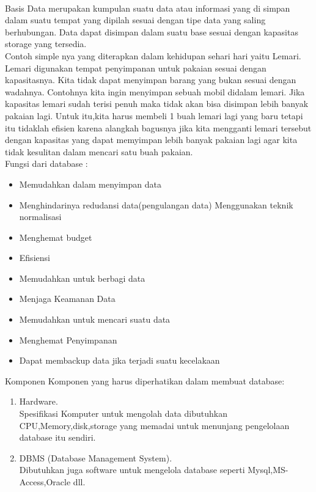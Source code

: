 \documentclass[12pt , a4paper]{article}
\begin{document}
\paragraph{}
	\indent Basis Data merupakan kumpulan suatu data atau informasi yang di simpan dalam suatu tempat yang dipilah sesuai dengan tipe data yang saling berhubungan. Data dapat disimpan dalam suatu base sesuai dengan kapasitas storage yang tersedia.\\
	\indent Contoh simple nya yang diterapkan dalam kehidupan sehari hari yaitu Lemari. Lemari digunakan tempat penyimpanan untuk pakaian sesuai dengan kapasitasnya. Kita tidak dapat menyimpan barang yang bukan sesuai dengan wadahnya. Contohnya kita ingin menyimpan sebuah mobil didalam lemari. Jika kapasitas lemari sudah terisi penuh maka tidak akan bisa disimpan lebih banyak pakaian lagi. Untuk itu,kita harus membeli 1 buah lemari lagi yang baru tetapi itu tidaklah efisien karena alangkah bagusnya jika kita mengganti lemari tersebut dengan kapasitas yang dapat memyimpan lebih banyak pakaian lagi agar kita tidak kesulitan dalam mencari satu buah pakaian.
	\\ 
	\indent Fungsi dari database : 

\begin{itemize}
\item Memudahkan dalam menyimpan data
\item Menghindarinya redudansi data(pengulangan data) Menggunakan teknik normalisasi
\item Menghemat budget
\item Efisiensi
\item Memudahkan untuk berbagi data
\item Menjaga Keamanan Data
\item Memudahkan untuk mencari suatu data
\item Menghemat Penyimpanan
\item Dapat membackup data jika terjadi suatu kecelakaan
\end{itemize}

\indent Komponen Komponen yang harus diperhatikan dalam membuat database: 
\begin{enumerate}
\item Hardware.\\
\indent Spesifikasi Komputer untuk mengolah data dibutuhkan CPU,Memory,disk,storage yang memadai untuk menunjang pengelolaan database itu sendiri.
\item DBMS  (Database Management System).\\
Dibutuhkan juga software untuk mengelola database seperti Mysql,MS-Access,Oracle dll. 
\end{enumerate}
\end{document}
